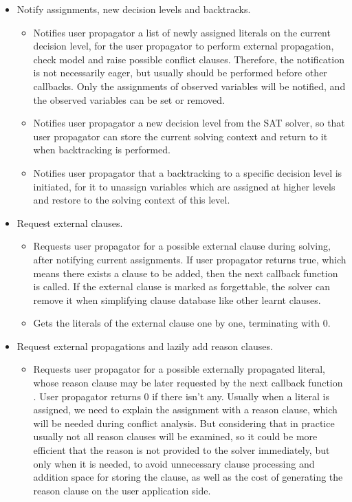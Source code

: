 \begin{itemize}
  \item Notify assignments, new decision levels and backtracks.
    \begin{itemize}
      \item {} Notifies user propagator a list of newly assigned literals on the current decision level, for the user propagator to perform external propagation, check model and raise possible conflict clauses. Therefore, the notification is not necessarily eager, but usually should be performed before other callbacks. Only the assignments of observed variables will be notified, and the observed variables can be set or removed.
      \item {} Notifies user propagator a new decision level from the SAT solver, so that user propagator can store the current solving context and return to it when backtracking is performed.
      \item {} Notifies user propagator that a backtracking to a specific decision level is initiated, for it to unassign variables which are assigned at higher levels and restore to the solving context of this level.
    \end{itemize}
  \item Request external clauses.
    \begin{itemize}
      \item {} Requests user propagator for a possible external clause during solving, after notifying current assignments. If user propagator returns true, which means there exists a clause to be added, then the next callback function  is called. If the external clause is marked as forgettable, the solver can remove it when simplifying clause database like other learnt clauses.
      \item {} Gets the literals of the external clause one by one, terminating with 0.  
    \end{itemize}
  \item Request external propagations and lazily add reason clauses.
    \begin{itemize}
      \item {} Requests user propagator for a possible externally propagated literal, whose reason clause may be later requested by the next callback function . User propagator returns 0 if there isn't any. Usually when a literal is assigned, we need to explain the assignment with a reason clause, which will be needed during conflict analysis. But considering that in practice usually not all reason clauses will be examined, so it could be more efficient that the reason is not provided to the solver immediately, but only when it is needed, to avoid unnecessary clause processing and addition space for storing the clause, as well as the cost of generating the reason clause on the user application side.

\end{itemize}
\end{itemize}
